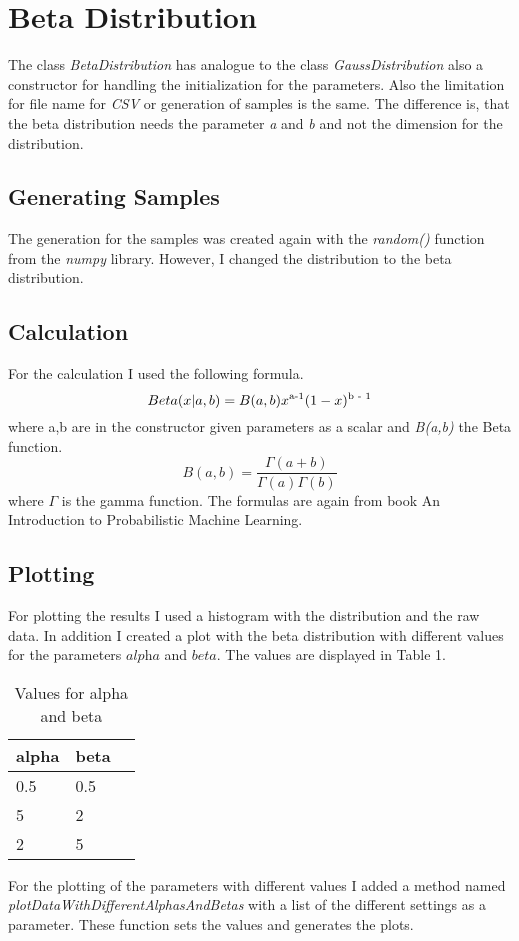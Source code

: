 \documentclass[10pt, a4paper, twocolumn]{article} %
\begin{document}
\section{Beta Distribution}
The class \textit{BetaDistribution} has analogue to the class \textit{GaussDistribution} also a constructor for handling the initialization for the parameters. Also the limitation for file name for \textit{CSV} or generation of samples is the same. The difference is, that the beta distribution needs the parameter \textit{a} and \textit{b} and not the dimension for the distribution. 

\subsection{Generating Samples}
The generation for the samples was created again with the \textit{random()} function from the \textit{numpy} library. However, I changed the distribution to the beta distribution. 

\subsection{Calculation}
For the calculation I used the following formula. 
\[
Beta(x|a,b) = B(a,b)x\textsuperscript{a-1}(1 - x)\textsuperscript{b - 1}
\]
where a,b are in the constructor given parameters as a scalar and \textit{B(a,b)} the Beta function. 
\[
B(a,b) = \frac{\Gamma(a + b)}{\Gamma(a)\Gamma(b)}
\]
where $\Gamma$ is the gamma function. The formulas are again from book An Introduction to Probabilistic Machine Learning.  
\citep{bookMachineLearning}


\subsection{Plotting}
For plotting the results I used a histogram with the distribution and the raw data. In addition I created a plot with the beta distribution with different values for the parameters $\textit{alpha}$ and $\textit{beta}$. The values are displayed in Table 1. 
\begin{table}[htbp]
    \label{tab:alphaBetaParameters}
	\caption{Values for alpha and beta}
	\centering
	\begin{tabular}{llr}
		\cmidrule(r){1-2}
		alpha & beta \\
		\midrule
		0.5 & 0.5 \\
		5 & 2 \\
		2 & 5 \\
		\bottomrule
	\end{tabular}
\end{table}
For the plotting of the parameters with different values I added a method named \textit{plotDataWithDifferentAlphasAndBetas} with a list of the different settings as a parameter. These function sets the values and generates the plots. 
\end{document}
